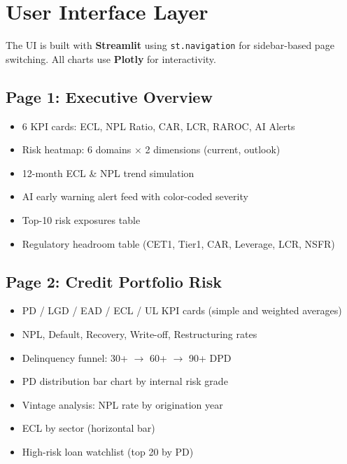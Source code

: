 \documentclass[12pt,a4paper]{article}
\begin{document}
\section{User Interface Layer}

The UI is built with \textbf{Streamlit} using \texttt{st.navigation} for sidebar-based page switching. All charts use \textbf{Plotly} for interactivity.

\subsection{Page 1: Executive Overview}

\begin{itemize}
    \item 6 KPI cards: ECL, NPL Ratio, CAR, LCR, RAROC, AI Alerts
    \item Risk heatmap: 6 domains $\times$ 2 dimensions (current, outlook)
    \item 12-month ECL \& NPL trend simulation
    \item AI early warning alert feed with color-coded severity
    \item Top-10 risk exposures table
    \item Regulatory headroom table (CET1, Tier1, CAR, Leverage, LCR, NSFR)
\end{itemize}

\subsection{Page 2: Credit Portfolio Risk}

\begin{itemize}
    \item PD / LGD / EAD / ECL / UL KPI cards (simple and weighted averages)
    \item NPL, Default, Recovery, Write-off, Restructuring rates
    \item Delinquency funnel: 30+ $\rightarrow$ 60+ $\rightarrow$ 90+ DPD
    \item PD distribution bar chart by internal risk grade
    \item Vintage analysis: NPL rate by origination year
    \item ECL by sector (horizontal bar)
    \item High-risk loan watchlist (top 20 by PD)
\end{itemize}
\end{document}
